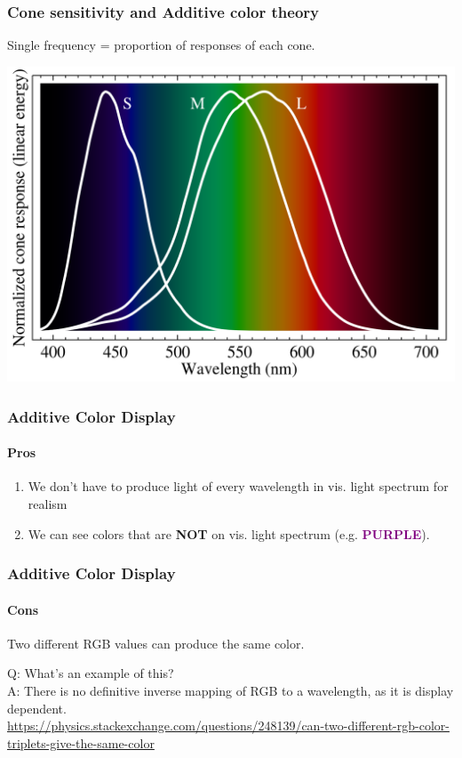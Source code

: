 \documentclass{beamer}
\begin{document}
\begin{frame}
    \frametitle{Cone sensitivity and Additive color theory}

    Single frequency = proportion of responses of each cone.

    \begin{center}
        \includegraphics[scale=0.2]{images/cone-vision.png}
    \end{center}

\end{frame}

\begin{frame}
    \frametitle{Additive Color Display}
    \framesubtitle{Pros}

    \begin{enumerate}
        \item We don't have to produce light of every wavelength in vis. light spectrum for realism
        \item We can see colors that are \textbf{NOT} on vis. light spectrum (e.g. \textcolor{purple}{\textbf{PURPLE}}).
    \end{enumerate}

\end{frame}

\begin{frame}
    \frametitle{Additive Color Display}
    \framesubtitle{Cons}

    Two different RGB values can produce the same color.\\

    \begin{tcolorbox}
        Q: What's an example of this?\\

        A: There is no definitive inverse mapping of RGB to a wavelength, as it is display dependent. \\
        {\tiny \url{https://physics.stackexchange.com/questions/248139/can-two-different-rgb-color-triplets-give-the-same-color}}
    \end{tcolorbox}
    
\end{frame}
\end{document}
